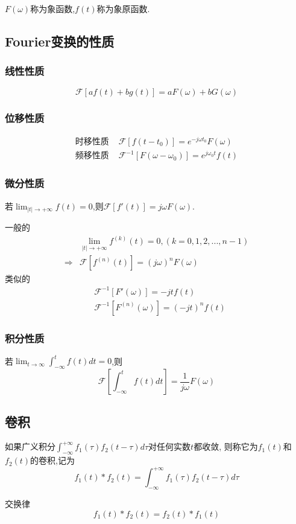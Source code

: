 \documentclass[12pt, a4paper, oneside]{ctexart}
\begin{document}
$F(\omega)$称为象函数,$f(t)$称为象原函数.
\subsection{Fourier变换的性质}
\subsubsection{线性性质}
\[
    \mathcal{F}[af(t)+bg(t)] = aF(\omega) + bG(\omega)
\]
\subsubsection{位移性质}
\begin{align*}
    \text{时移性质 }&\mathcal{F}[f(t-t_0)] = e^{-j\omega t_0}F(\omega)\\
    \text{频移性质 }&\mathcal{F}^{-1}[F(\omega-\omega_0)] = e^{j\omega_0 t}f(t)
\end{align*}
\subsubsection{微分性质}
若$\lim_{|t|\to+\infty}f(t)=0$,则$\mathcal{F}[f'(t)]=j\omega F(\omega)$.

一般的
\begin{align*}
    &\lim_{|t|\to+\infty}f^{(k)}(t)=0,(k=0,1,2,...,n-1)\\
    \Rightarrow &\mathcal{F}[f^{(n)}(t)]=(j\omega)^nF(\omega)
\end{align*}
类似的
\begin{align*}
    &\mathcal{F}^{-1}[F'(\omega)]=-jtf(t)\\
    &\mathcal{F}^{-1}[F^{(n)}(\omega)]=(-jt)^nf(t)
\end{align*}
\subsubsection{积分性质}
若$\lim_{t\to\infty}\int_{-\infty}^{t}f(t)dt=0$,则
\[
    \mathcal{F}[\int_{-\infty}^{t}f(t)dt]=\frac{1}{j\omega}F(\omega)
\]
\subsection{卷积}
如果广义积分$\int_{-\infty}^{+\infty}f_1(\tau)f_2(t-\tau)d\tau$对任何实数$t$都收敛,
则称它为$f_1(t)$和$f_2(t)$的卷积,记为
\[
    f_1(t) * f_2(t) = \int_{-\infty}^{+\infty}f_1(\tau)f_2(t-\tau)d\tau
\]

交换律
\[
    f_1(t) * f_2(t) = f_2(t) * f_1(t)
\]
\end{document}
